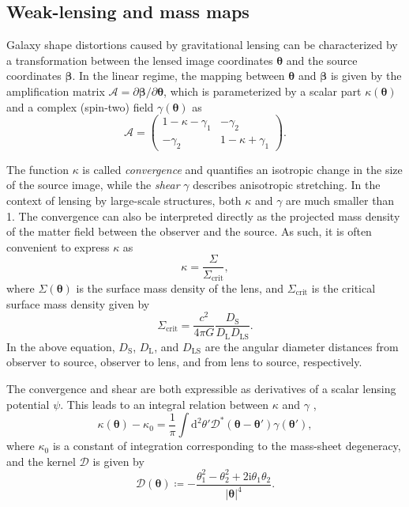 \documentclass[iop,twocolappendix]{emulateapj}
\begin{document}
\subsection{Weak-lensing and mass maps}
Galaxy shape distortions caused by gravitational lensing can be characterized by a transformation
between the lensed image coordinates $\bm\theta$ and the source coordinates $\bm\beta$.
In the linear regime, the mapping between $\bm\theta$ and $\bm\beta$ is given by the amplification
matrix $\mathcal{A}=\partial\bm\beta/\partial\bm\theta$, which is parameterized by a scalar part 
$\kappa(\bm\theta)$ and a complex (spin-two) field $\gamma(\bm\theta)$ as
\begin{equation}
   \mathcal{A} = 
     \begin{pmatrix}
       1 - \kappa - \gamma_1 & -\gamma_2 \\
       -\gamma_2 & 1 - \kappa + \gamma_1
     \end{pmatrix}.
\end{equation}

The function $\kappa$ is called \textit{convergence} and quantifies an isotropic change in the 
size of the source image, while the \textit{shear} $\gamma$ describes anisotropic stretching. 
In the context of lensing by large-scale structures, 
both $\kappa$ and $\gamma$ are much smaller than 1. The convergence can also be interpreted 
directly as the projected mass density of the matter field between the observer and the source.
As such, it is often convenient to express $\kappa$ as
\begin{equation}
  \kappa = \frac{\Sigma}{\Sigma_\mathrm{crit}},
\end{equation}
where $\Sigma(\bm\theta)$ is the surface mass density of the lens, and $\Sigma_\mathrm{crit}$ is 
the critical surface mass density given by
\begin{equation}
  \Sigma_\mathrm{crit} = \frac{c^2}{4\pi G}\frac{D_\mathrm{S}}{D_\mathrm{L}D_\mathrm{LS}}.
\end{equation}
In the above equation, $D_\mathrm{S}$, $D_\mathrm{L}$, and $D_\mathrm{LS}$ are the angular 
diameter distances from observer to source, observer to lens, and from lens to source, 
respectively.

The convergence and shear are both expressible as derivatives of a scalar lensing potential 
$\psi$. This leads to an integral relation between $\kappa$ and $\gamma$ \citep{KS.1993},
\begin{equation}
  \kappa(\bm\theta) - \kappa_0 = \frac{1}{\pi}\int \mathrm{d}^2\theta' 
                                 \mathcal{D}^*(\bm\theta - \bm\theta') \gamma(\bm\theta'),
\label{eq:kappa_from_gamma}
\end{equation}
where $\kappa_0$ is a constant of integration corresponding to the mass-sheet degeneracy, and
the kernel $\mathcal{D}$ is given by
\begin{equation}
  \mathcal{D}(\bm\theta) \coloneqq -\frac{\theta_1^2 - \theta_2^2 + 2\mathrm{i}\theta_1\theta_2}{|\bm\theta|^4}.
\end{equation}
\end{document}
